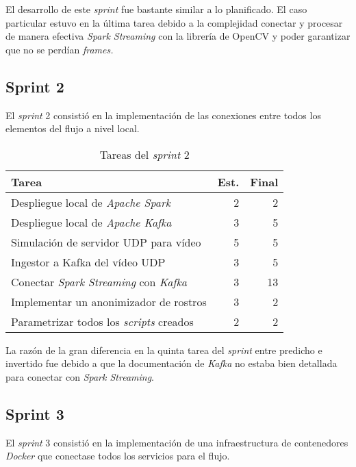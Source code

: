 El desarrollo de este \textit{sprint} fue bastante similar a lo planificado. El caso particular estuvo en la última tarea debido a la complejidad conectar y procesar de manera efectiva \textit{Spark Streaming} con la librería de OpenCV y poder garantizar que no se perdían \textit{frames.}

\subsection{Sprint 2}

El \textit{sprint} 2 consistió en la implementación de las conexiones entre todos los elementos del flujo a nivel local. 

\begin{table}[H]
	\begin{tabularx}{\linewidth}{X r r}
		\toprule \textbf{Tarea} & \textbf{Est.} & \textbf{Final}\\
		\toprule
		Despliegue local de \textit{Apache Spark} & 2 & 2\\
		Despliegue local de \textit{Apache Kafka} & 3 & 5\\
		Simulación de servidor UDP para vídeo & 5 & 5 \\
		Ingestor a Kafka del vídeo UDP & 3 & 5\\
		Conectar \textit{Spark Streaming} con \textit{Kafka}& 3 & 13\\
		Implementar un anonimizador de rostros & 3 & 2\\
		Parametrizar todos los \textit{scripts} creados & 2 & 2	\\
		\bottomrule
	\end{tabularx}
	\caption{Tareas del \textit{sprint} 2}
	\label{tab:sprint2}
\end{table}

La razón de la gran diferencia en la quinta tarea del \textit{sprint} entre predicho e invertido fue debido a que la documentación de \textit{Kafka} no estaba bien detallada para conectar con \textit{Spark Streaming}. 

\subsection{Sprint 3}

El \textit{sprint} 3 consistió en la implementación de una infraestructura de contenedores \textit{Docker} que conectase todos los servicios para el flujo. 


